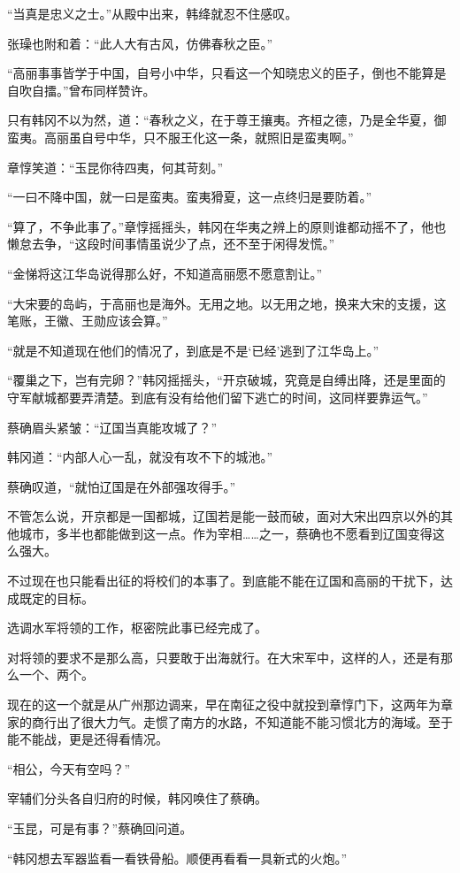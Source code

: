“当真是忠义之士。”从殿中出来，韩绛就忍不住感叹。

张璪也附和着：“此人大有古风，仿佛春秋之臣。”

“高丽事事皆学于中国，自号小中华，只看这一个知晓忠义的臣子，倒也不能算是自吹自擂。”曾布同样赞许。

只有韩冈不以为然，道：“春秋之义，在于尊王攘夷。齐桓之德，乃是全华夏，御蛮夷。高丽虽自号中华，只不服王化这一条，就照旧是蛮夷啊。”

章惇笑道：“玉昆你待四夷，何其苛刻。”

“一曰不降中国，就一曰是蛮夷。蛮夷猾夏，这一点终归是要防着。”

“算了，不争此事了。”章惇摇摇头，韩冈在华夷之辨上的原则谁都动摇不了，他也懒怠去争，“这段时间事情虽说少了点，还不至于闲得发慌。”

“金悌将这江华岛说得那么好，不知道高丽愿不愿意割让。”

“大宋要的岛屿，于高丽也是海外。无用之地。以无用之地，换来大宋的支援，这笔账，王徽、王勋应该会算。”

“就是不知道现在他们的情况了，到底是不是‘已经’逃到了江华岛上。”

“覆巢之下，岂有完卵？”韩冈摇摇头，“开京破城，究竟是自缚出降，还是里面的守军献城都要弄清楚。到底有没有给他们留下逃亡的时间，这同样要靠运气。”

蔡确眉头紧皱：“辽国当真能攻城了？”

韩冈道：“内部人心一乱，就没有攻不下的城池。”

蔡确叹道，“就怕辽国是在外部强攻得手。”

不管怎么说，开京都是一国都城，辽国若是能一鼓而破，面对大宋出四京以外的其他城市，多半也都能做到这一点。作为宰相……之一，蔡确也不愿看到辽国变得这么强大。

不过现在也只能看出征的将校们的本事了。到底能不能在辽国和高丽的干扰下，达成既定的目标。

选调水军将领的工作，枢密院此事已经完成了。

对将领的要求不是那么高，只要敢于出海就行。在大宋军中，这样的人，还是有那么一个、两个。

现在的这一个就是从广州那边调来，早在南征之役中就投到章惇门下，这两年为章家的商行出了很大力气。走惯了南方的水路，不知道能不能习惯北方的海域。至于能不能战，更是还得看情况。

“相公，今天有空吗？”

宰辅们分头各自归府的时候，韩冈唤住了蔡确。

“玉昆，可是有事？”蔡确回问道。

“韩冈想去军器监看一看铁骨船。顺便再看看一具新式的火炮。”

